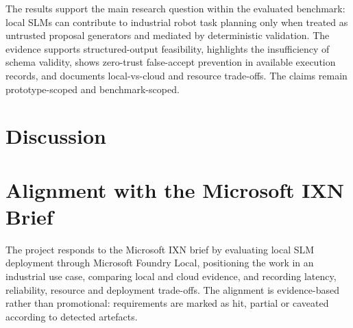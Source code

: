 \documentclass[sigconf,nonacm]{acmart}
\begin{document}
The results support the main research question within the evaluated benchmark: local SLMs can contribute to industrial robot task planning only when treated as untrusted proposal generators and mediated by deterministic validation. The evidence supports structured-output feasibility, highlights the insufficiency of schema validity, shows zero-trust false-accept prevention in available execution records, and documents local-vs-cloud and resource trade-offs. The claims remain prototype-scoped and benchmark-scoped.

\section{Discussion}

\section{Alignment with the Microsoft IXN Brief}
\label{sec:microsoft_brief_alignment}

The project responds to the Microsoft IXN brief by evaluating local SLM deployment through Microsoft Foundry Local, positioning the work in an industrial use case, comparing local and cloud evidence, and recording latency, reliability, resource and deployment trade-offs. The alignment is evidence-based rather than promotional: requirements are marked as hit, partial or caveated according to detected artefacts.
\end{document}

